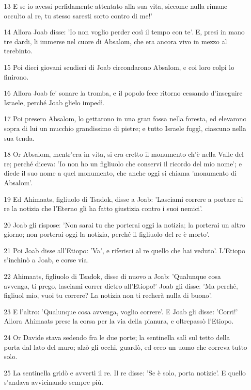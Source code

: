 \par 13 E se io avessi perfidamente attentato alla sua vita, siccome nulla rimane occulto al re, tu stesso saresti sorto contro di me!'
\par 14 Allora Joab disse: 'Io non voglio perder così il tempo con te'. E, presi in mano tre dardi, li immerse nel cuore di Absalom, che era ancora vivo in mezzo al terebinto.
\par 15 Poi dieci giovani scudieri di Joab circondarono Absalom, e coi loro colpi lo finirono.
\par 16 Allora Joab fe' sonare la tromba, e il popolo fece ritorno cessando d'inseguire Israele, perché Joab glielo impedì.
\par 17 Poi presero Absalom, lo gettarono in una gran fossa nella foresta, ed elevarono sopra di lui un mucchio grandissimo di pietre; e tutto Israele fuggì, ciascuno nella sua tenda.
\par 18 Or Absalom, mentr'era in vita, si era eretto il monumento ch'è nella Valle del re; perché diceva: 'Io non ho un figliuolo che conservi il ricordo del mio nome'; e diede il suo nome a quel monumento, che anche oggi si chiama 'monumento di Absalom'.
\par 19 Ed Ahimaats, figliuolo di Tsadok, disse a Joab: 'Lasciami correre a portare al re la notizia che l'Eterno gli ha fatto giustizia contro i suoi nemici'.
\par 20 Joab gli rispose: 'Non sarai tu che porterai oggi la notizia; la porterai un altro giorno; non porterai oggi la notizia, perché il figliuolo del re è morto'.
\par 21 Poi Joab disse all'Etiopo: 'Va', e riferisci al re quello che hai veduto'. L'Etiopo s'inchinò a Joab, e corse via.
\par 22 Ahimaats, figliuolo di Tsadok, disse di nuovo a Joab: 'Qualunque cosa avvenga, ti prego, lasciami correr dietro all'Etiopo!' Joab gli disse: 'Ma perché, figliuol mio, vuoi tu correre? La notizia non ti recherà nulla di buono'.
\par 23 E l'altro: 'Qualunque cosa avvenga, voglio correre'. E Joab gli disse: 'Corri!' Allora Ahimaats prese la corsa per la via della pianura, e oltrepassò l'Etiopo.
\par 24 Or Davide stava sedendo fra le due porte; la sentinella salì sul tetto della porta dal lato del muro; alzò gli occhi, guardò, ed ecco un uomo che correva tutto solo.
\par 25 La sentinella gridò e avvertì il re. Il re disse: 'Se è solo, porta notizie'. E quello s'andava avvicinando sempre più.
